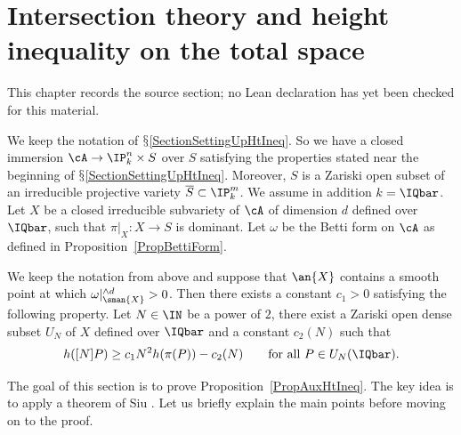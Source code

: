 \chapter{Intersection theory and height inequality on the total space}
\label{uniformity-mordell-lang-curves-chapter-04}

\begin{remark}
\label{uniformity-mordell-lang-curves-chapter-04-source}
This chapter records the source section; no Lean declaration has yet been checked for this material.
\notready
\end{remark}

\label{SectionIntThAndHtIneq}

We keep the notation of $\mathsection$\ref{SectionSettingUpHtIneq}.
So we have a closed immersion $\cA\rightarrow \IP_k^n\times
S$ over $S$ satisfying the properties stated near the beginning
of $\mathsection$\ref{SectionSettingUpHtIneq}. Moreover, $S$ is a
Zariski open subset of an irreducible projective variety $\overline
S\subset\IP_k^m$.
We assume in addition $k = \IQbar$. Let $X$ be a closed irreducible subvariety of $\cA$ of dimension $d$ defined over $\IQbar$, such that $\pi|_X \colon X\rightarrow S$ is dominant. Let $\omega$ be the Betti form on $\cA$ as defined in Proposition~\ref{PropBettiForm}.
\begin{proposition}
\notready\label{PropAuxHtIneq}
We keep the notation from above and
suppose that $\an{X}$ contains a smooth point at which
$\omega|_{\sman{X}}^{\wedge d} >0$. Then there exists a constant $c_1
> 0$ satisfying the following property.
Let $N \in \IN$ be a power of $2$, there exist a Zariski open dense subset $U_N$ of $X$ defined over $\IQbar$ and a constant $c_2(N)$ such that
\[
h([N]P) \ge c_1 N^2 h(\pi(P)) - c_2(N)\qquad \text{for all }P \in U_N(\IQbar).
\]
\end{proposition}

The goal of this section is to prove Proposition~\ref{PropAuxHtIneq}.
The key idea is to apply a theorem of Siu \cite[Theorem~2.2.15]{PosAlgGeom}. Let us briefly explain the main points before moving on to the proof.

